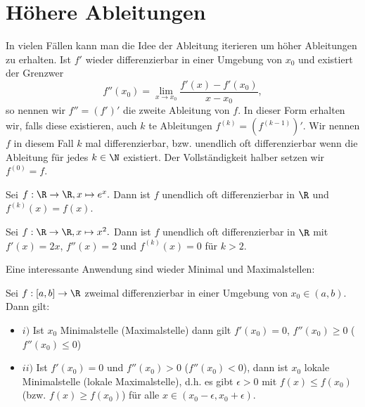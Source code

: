 \documentclass[letterpaper,10pt,english]{jupyterBook}
\begin{document}
\section{Höhere Ableitungen}
\label{\detokenize{differential/hoehereOrdnung:hohere-ableitungen}}\label{\detokenize{differential/hoehereOrdnung::doc}}
In vielen Fällen kann man die Idee der Ableitung iterieren um höher Ableitungen zu erhalten. Ist \(f'\) wieder differenzierbar in einer Umgebung von \(x_0\) und existiert der Grenzwer
\begin{equation*}
 f''(x_0) = \lim_{x \rightarrow x_0} \frac{f'(x) - f'(x_0)}{x-x_0} ,
\end{equation*}
so nennen wir \(f'' = (f')'\) die zweite Ableitung von \(f\). In dieser Form erhalten wir, falls diese existieren, auch \(k\) te Ableitungen \(f^{(k)}=(f^{(k-1)})'\). Wir nennen \(f\) in diesem Fall \(k\) mal differenzierbar, bzw. unendlich oft differenzierbar wenn die Ableitung für jedes \(k \in \N\) existiert. Der Vollständigkeit halber setzen wir \(f^{(0)} = f\).
\label{differential/hoehereOrdnung:example-0}
\begin{example}{}{}



Sei \(f: \R \rightarrow \R, x \mapsto e^x.\) Dann ist \(f\) unendlich oft differenzierbar in \(\R\) und \(f^{(k)}(x)=f(x)\).
\end{example}
\label{differential/hoehereOrdnung:example-1}
\begin{example}{}{}



Sei \(f: \R \rightarrow \R, x \mapsto x^2.\) Dann ist \(f\) unendlich oft differenzierbar in \(\R\) mit \(f'(x)=2x\), \(f''(x)=2\) und \(f^{(k)}(x)=0\) für \(k > 2\).
\end{example}

Eine interessante Anwendung sind wieder Minimal  und Maximalstellen:
\label{differential/hoehereOrdnung:theorem-2}
\begin{theorem}{}{}



Sei \(f:[a,b]\rightarrow \R\) zweimal differenzierbar in einer Umgebung von \(x_0 \in (a,b)\). Dann gilt:
\begin{itemize}
\item {} 
\(i)\) Ist \(x_0\) Minimalstelle (Maximalstelle) dann gilt \(f'(x_0) = 0\), \(f''(x_0) \geq 0\) (\(f''(x_0) \leq 0\))

\item {} 
\(ii)\) Ist \(f'(x_0) = 0\) und \(f''(x_0) > 0\) (\(f''(x_0) < 0\)), dann ist \(x_0\) lokale Minimalstelle (lokale Maximalstelle), d.h. es gibt \(\epsilon > 0\) mit \(f(x) \leq f(x_0)\) (bzw. \(f(x) \geq f(x_0)\)) für alle \(x\in (x_0-\epsilon, x_0+\epsilon)\).

\end{itemize}
\end{theorem}
\end{document}
